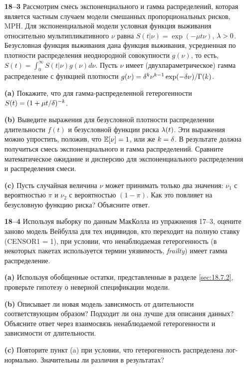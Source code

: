 \begin{itemize}
    \item[\textbf{18--3}]
Рассмотрим смесь экспоненциального и гамма распределений, которая является частным случаем модели смешанных пропорциональных рисков, MPH. Для экспоненциальной модели условная функция выживания относительно мультипликативного $\nu$ равна $S(t|\nu) = \exp(-\mu t \nu)$, $\lambda > 0$. Безусловная функция выживания дана функция выживания, усредненная по плотности распределения неоднородной совокупности $g(\nu)$, то есть, $S(t) = \int^{\infty}_{0} S(t|\nu)g(\nu)d\nu$. Пусть $\nu$ имеет (двухпараметрическое) гамма распределение с функцией плотности $g(\nu) = \delta^k\nu^{k-1}\exp(-\delta\nu)/\Gamma(k)$.
        \item[\textbf{(a)}]
Покажите, что для гамма-распределенной гетерогенности $S(t) = (1 + \mu t /\delta)^{-k}$.
        \item[\textbf{(b)}]
Выведите выражения для безусловной плотности распределении длительности $f(t)$ и безусловной функции риска $\lambda(t)$. Эти выражения можно упростить, положив, что $\mathbb{E}[\nu] = 1$, или же $k = \delta$. В результате должна получиться смесь экспоненциального и гамма распределений. Сравните математическое ожидание и дисперсию для экспоненциального распределения и распределения смеси.

        \item[\textbf{(c)}]
Пусть случайная величина $\nu$ может принимать только два значения: $\nu_1$ с вероятностью $\pi$ и $\nu_2$ с вероятностью $(1 - \pi)$. Как это повлияет на безусловную функцию риска? Объясните ответ.

    \item[\textbf{18--4}]
Используя выборку по данным МакКолла из упражнения 17--3, оцените заново модель Вейбулла для тех индивидов, кто переходит на полную ставку (CENSOR1 = 1), при условии, что ненаблюдаемая гетерогенность (в некоторых пакетах используется термин уязвимость, \textit{frailty}) имеет гамма распределение.
        \item[\textbf{(a)}]
Используя обобщенные остатки, представленные в разделе \ref{sec:18.7.2}, проверьте гипотезу о неверной спецификации модели.
        \item[\textbf{(b)}]
Описывает ли новая модель зависимость от длительности соответствующим образом? Подходит ли она лучше для описания данных? %
Объясните ответ через взаимосвязь ненаблюдаемой гетерогенности и зависимости от длительности.
        \item[\textbf{(c)}]
Повторите пункт (a) при условии, что гетерогенность распределена лог-нормально. Значительны ли различия в результатах?
\end{itemize}

